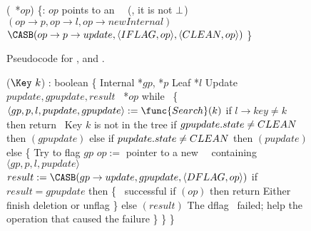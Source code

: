 \begin{figure*}
\begin{code}
		(\IFlag\ *$op$) \{\ul
		\n     {}:  $op$ points to an \IFlag\ \record\  (\ie, it is not $\perp$)\nlc
		$(op\rightarrow p, op\rightarrow l, op\rightarrow newInternal)$ \label{ichild-cas}\nlc
		$\CASB(op\rightarrow p\rightarrow update, \langle \insertflag, op \rangle, \langle \clean, op\rangle)$  \label{iunflag-cas}\nlc
		\p
		\}
	\end{code}
	\caption{\label{code2}Pseudocode for ,  and .}
\end{figure*}

\begin{figure*}
	\scriptsize
	\begin{code}
		\firstline
		($\Key\ k$) : boolean \{\nlc
		\n Internal *$gp$, *$p$\nlc
		Leaf *$l$\nlc
		Update $pupdate, gpupdate, result$\nlc
		\DFlag\ *$op$\bl\nlc
		while \TRUE\ \{ \nlc
		\n     $\langle gp, p, l, pupdate, gpupdate \rangle := \func{Search}(k)$\label{del-search}\nlc
		if $l\rightarrow key \neq k$ then return \FALSE\ \tabtabcom Key $k$ is not in the tree\label{delete-false}\nlc
		if $gpupdate.state \neq C\scriptsize LEAN \normalsize$ then $(gpupdate)$ \label{del-help-unclean-1}\nlc
		else if $pupdate.state \neq C\scriptsize LEAN \normalsize$ then $(pupdate)$\label{del-help-unclean-2}\nlc
		else \{ \tabtabcom Try to flag $gp$\nlc
		\n          $op :=$ pointer to a new \DFlag\ \record\  containing $\langle gp, p, l, pupdate \rangle$\label{new-DFlag}\nlc
		$result := \CASB(gp\rightarrow update, gpupdate, \langle \deleteflag, op \rangle)$ \label{dflag-cas}\nlc
		if $result = gpupdate$ then \{ \tabtabcom \CASB\ successful \nlc
		\n             if $(op)$ then return \TRUE \label{delete-true} \tabtabcom Either finish deletion or unflag\nlc
		\p          \}\nlc                 
		else $(result)$ \tabcom The dflag \CASB\ failed; help the operation that caused the failure \label{del-help-after-failure}\nlc%
		\p     \}\nlc
		\p \}\nlc
		\p
		\}\bl
		\nlc
		

\end{code}
\end{figure*}
